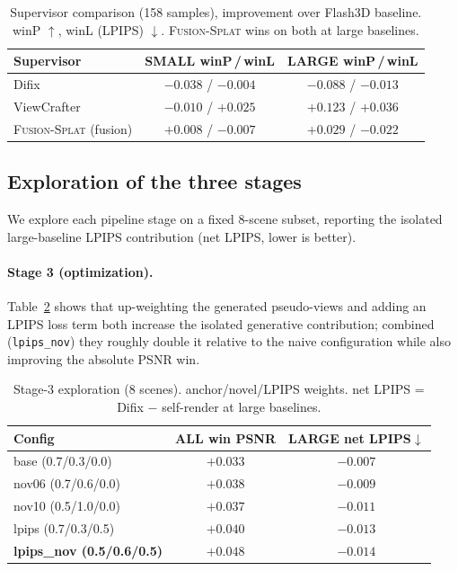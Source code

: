 \documentclass[10pt,twocolumn,letterpaper]{article}
\newcommand{\method}{\textsc{Fusion-Splat}}
\begin{document}
\begin{table}[t]
\centering
\small
\caption{Supervisor comparison (158 samples), improvement over Flash3D baseline.
winP $\uparrow$, winL (LPIPS) $\downarrow$. \method{} wins on both at large baselines.}
\label{tab:supervisor}
\begin{tabular}{lcc}
\toprule
Supervisor & SMALL winP\,/\,winL & LARGE winP\,/\,winL \\
\midrule
Difix                 & $-0.038$ / $-0.004$ & $-0.088$ / $-0.013$ \\
ViewCrafter           & $-0.010$ / $+0.025$ & $\mathbf{+0.123}$ / $+0.036$ \\
\method{} (fusion)    & $+0.008$ / $-0.007$ & $+0.029$ / $\mathbf{-0.022}$ \\
\bottomrule
\end{tabular}
\end{table}

\subsection{Exploration of the three stages}
We explore each pipeline stage on a fixed 8-scene subset, reporting the isolated
large-baseline LPIPS contribution (net LPIPS, lower is better).

\paragraph{Stage 3 (optimization).}
Table~\ref{tab:stage3} shows that up-weighting the generated pseudo-views and
adding an LPIPS loss term both increase the isolated generative contribution;
combined (\texttt{lpips\_nov}) they roughly double it relative to the naive
configuration while also improving the absolute PSNR win.

\begin{table}[t]
\centering
\small
\caption{Stage-3 exploration (8 scenes). anchor/novel/LPIPS weights.
net LPIPS = Difix $-$ self-render at large baselines.}
\label{tab:stage3}
\begin{tabular}{lcc}
\toprule
Config & ALL win PSNR & LARGE net LPIPS$\downarrow$ \\
\midrule
base (0.7/0.3/0.0)      & $+0.033$ & $-0.007$ \\
nov06 (0.7/0.6/0.0)     & $+0.038$ & $-0.009$ \\
nov10 (0.5/1.0/0.0)     & $+0.037$ & $-0.011$ \\
lpips (0.7/0.3/0.5)     & $+0.040$ & $-0.013$ \\
\textbf{lpips\_nov (0.5/0.6/0.5)} & $\mathbf{+0.048}$ & $\mathbf{-0.014}$ \\
\bottomrule
\end{tabular}
\end{table}
\end{document}
